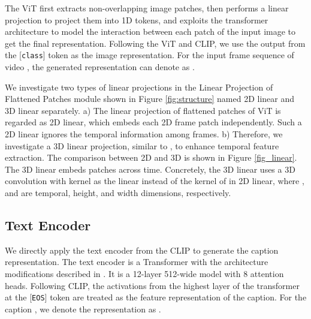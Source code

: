 \documentclass[11pt]{article}
\begin{document}
	The ViT \cite{dosovitskiy2021an} first extracts non-overlapping image patches, then performs a linear projection to project them into 1D tokens, and exploits the transformer architecture to model the interaction between each patch of the input image to get the final representation. Following the ViT and CLIP, we use the output from the [\texttt{class}] token as the image representation. For the input frame sequence of video , the generated representation can denote as .

	We investigate two types of linear projections in the Linear Projection of Flattened Patches module shown in Figure \ref{fig:structure} named 2D linear and 3D linear separately. a) The linear projection of flattened patches of ViT is regarded as 2D linear, which embeds each 2D frame patch independently. Such a 2D linear ignores the temporal information among frames. b) Therefore, we investigate a 3D linear projection, similar to \cite{arnab2021vivit}, to enhance temporal feature extraction. The comparison between 2D and 3D is shown in Figure \ref{fig_linear}. The 3D linear embeds patches across time. Concretely, the 3D linear uses a 3D convolution with kernel  as the linear instead of the kernel of  in 2D linear, where , and  are temporal, height, and width dimensions, respectively.

	\subsection{Text Encoder} We directly apply the text encoder from the CLIP to generate the caption representation. The text encoder is a Transformer \cite{vaswani2017attention} with the architecture modifications described in \cite{radford2019language}. It is a 12-layer 512-wide model with 8 attention heads. Following CLIP, the activations from the highest layer of the transformer at the [\texttt{EOS}] token are treated as the feature representation of the caption. For the caption , we denote the representation as .
\end{document}
